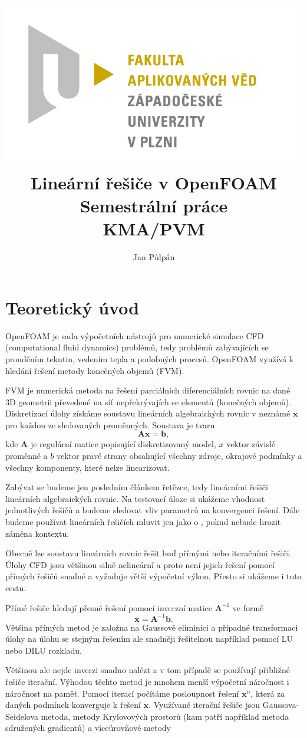 \documentclass[a4paper,12pt]{report}
\title{
	{\includegraphics[width=\linewidth]{FAV_logo.jpg}}\\[2cm]
	{Lineární řešiče v OpenFOAM}\\	
	{\small{Semestrální práce}}\\
	{\small{KMA/PVM}}\\
}
\author{Jan Půlpán}
\theoremstyle{remark}
\begin{document}
	\maketitle

	{\let\clearpage\relax \chapter{Teoretický úvod}}



	
	OpenFOAM je sada výpočetních nástrojů pro numerické simulace CFD (computational fluid dynamics) problémů, tedy problémů zabývajících se prouděním tekutin, vedením tepla a podobných procesů. OpenFOAM využívá k hledání řešení metody konečných objemů (FVM). 
	
	FVM je numerická metoda na řešení parciálních diferenciálních rovnic na dané 3D geometrii převedené na síť nepřekrývajích se elementů (konečných objemů). Diskretizací úlohy získáme soustavu lineárních algebraických rovnic v neznámé $\boldsymbol{x}$ pro každou ze sledovaných proměnných. Soustava je tvaru
	\begin{equation}
		\boldsymbol{A}\boldsymbol{x} = \boldsymbol{b},
		\label{eq:linear_set}
	\end{equation}
	kde $\boldsymbol{A}$ je regulární matice popisující diskretizovaný model, $x$ vektor závislé proměnné a $b$ vektor pravé strany obsahující všechny zdroje, okrajové podmínky a všechny komponenty, které nelze linearizovat. 
	
	Zabývat se budeme jen posledním článkem řetězce, tedy lineárními řešiči lineárních algebraických rovnic. Na testovací úloze si ukážeme vhodnost jednotlivých řešičů a budeme sledovat vliv parametrů na konvergenci řešení. Dále budeme používat lineárních řešičích mluvit jen jako o  , pokud nebude hrozit záměna kontextu.
	
	Obecně lze soustavu lineárních rovnic řešit buď přímými nebo iteračními řešiči. Úlohy CFD jsou většinou silně nelineární a proto není jejich řešení pomocí přímých řešičů snadné a vyžaduje větší výpočetní výkon. Přesto si ukážeme i tuto cestu.
	
	Přímé řešiče hledají přesné řešení pomocí inverzní matice $\boldsymbol{A} ^{-1} $ ve formě
$$ \boldsymbol{x} = \boldsymbol{A}^{-1} \boldsymbol{b}.$$  
Většina přímých metod je založna na Gaussově eliminici a případné transformaci úlohy na úlohu se stejným řešením ale snadněji řešitelnou například pomocí LU nebo DILU rozkladu.

	Většinou ale nejde inverzi snadno nalézt a v tom případě se používají přibližné řešiče iterační. Výhodou těchto metod je mnohem menší výpočetní náročnost i náročnost na paměť. Pomocí iterací počítáme posloupnost řešení $\boldsymbol{x}^{n}$, která za daných podmínek konverguje k řešení $\boldsymbol{x}$.  Využívané iterační řešiče jsou Gaussova-Seidelova metoda, metody Krylovových prostorů (kam patří například metoda sdružených gradientů) a víceúrovňové metody
	
\end{document}
